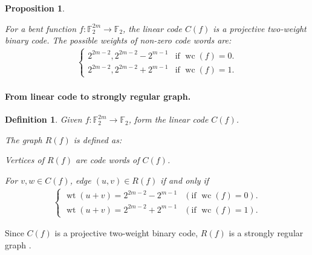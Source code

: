 \documentclass[12pt,a4paper]{article}
\newcommand{\mb}[1]{\mathbb{#1}}
\newcommand{\F}{\mb{F}}
\newcommand{\To}{\rightarrow}
\newcommand{\weight}[1]{\operatorname{wt}\left(#1\right)}
\newcommand{\weightclass}[1]{\operatorname{wc}\left(#1\right)}
\newtheorem{Proposition}{Proposition}
\newtheorem{Definition}{Definition}
\begin{document}
%
\begin{Proposition}
\cite[Corollary 10]{DinD15class}

For a bent function $f : \F_2^{2m} \To \F_2$, the linear code $C(f)$
is a projective two-weight binary code.
%
%
The possible weights of non-zero code words are:
\begin{align*}
\begin{cases}
2^{2m-2}, 2^{2m-2} - 2^{m-1} & \text{if~} \weightclass{f}=0.
\\
2^{2m-2}, 2^{2m-2} + 2^{m-1} & \text{if~} \weightclass{f}=1.
\end{cases}
\end{align*}
%
\end{Proposition}
%
%
\paragraph*{From linear code to strongly regular graph.}
\begin{Definition}
\label{R-f-def}
Given $f : \F_2^{2m} \To \F_2$, form the linear code $C(f)$.

The graph $R(f)$ is defined as:

Vertices of $R(f)$ are code words of $C(f)$.

For $v,w \in C(f)$, edge $(u,v) \in R(f)$ if and only if
\begin{align*}
\begin{cases}
\weight{u+v} = 2^{2m-2} - 2^{m-1} & (\text{if~}\weightclass{f}=0).
\\
\weight{u+v} = 2^{2m-2} + 2^{m-1} & (\text{if~}\weightclass{f}=1).
\end{cases}
\end{align*}

\end{Definition}
Since $C(f)$ is a projective two-weight binary code,
$R(f)$ is a strongly regular graph \cite[Theorem 2]{Del72weights}.


\end{document}

